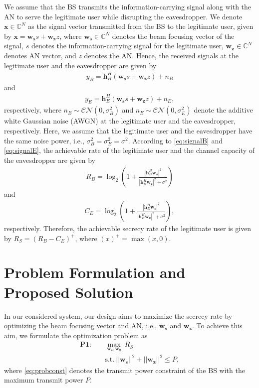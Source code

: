\documentclass[10pt,technote]{IEEEtran}
\newcommand{\1}{\mathbbm{1}}
\begin{document}
We assume that the BS transmits the information-carrying signal along with the AN to serve the legitimate user while disrupting the eavesdropper. We denote $\mathbf{x}\in \mathbb{C}^N$ as the signal vector transmitted from the BS to the legitimate user, given by $\mathbf{x} = \mathbf{w_s}s + \mathbf{w_z}z$, where $\mathbf{w_s}\in \mathbb{C}^N$ denotes the beam focusing vector of the signal, $s$ denotes the information-carrying signal for the legitimate user, $\mathbf{w_z}\in \mathbb{C}^N$ denotes AN vector, and $z$ denotes the AN. Hence, the received signals at the legitimate user and the eavesdropper are given by
\begin{align}\label{eq:signalB}
y_B =  \mathbf{h}_{B}^{H} \left(\mathbf{w_s}s + \mathbf{w_z}z\right)+n_{B}
\end{align}
and
\begin{align}\label{eq:signalE}
y_E =  \mathbf{h}_{E}^{H} \left(\mathbf{w_s}s + \mathbf{w_z}z\right)+n_{E},
\end{align}
respectively, where $n_B\sim \mathcal{CN}(0,\sigma_B^2)$ and $n_E\sim \mathcal{CN}(0,\sigma_E^2)$ denote the additive white Gaussian noise (AWGN) at the legitimate user and the eavesdropper, respectively. Here, we assume that the legitimate user and the eavesdropper have the same noise power, i.e., $\sigma_B^2=\sigma_E^2=\sigma^2$. According to \eqref{eq:signalB} and \eqref{eq:signalE}, the achievable rate of the legitimate user and the channel capacity of the eavesdropper are given by
\begin{align}
R_B = \log_2\left(1+\frac{|\mathbf{h}_{B}^{H} \mathbf{w_s}|^2}{|\mathbf{h}_{B}^{H}\mathbf{w_z}|^2+\sigma^2}\right)
\end{align}
and 
\begin{align}
C_E = \log_2\left(1+\frac{|\mathbf{h}_{E}^{H} \mathbf{w_s}|^2}{|\mathbf{h}_{E}^{H}\mathbf{w_z}|^2+\sigma^2}\right),
\end{align}
respectively. Therefore, the achievable secrecy rate of the legitimate user is given by $R_S = \left(R_B-C_E\right)^+$, where $(x)^+=\max(x,0)$. 

\section{Problem Formulation and Proposed Solution}\label{Sec:Coverage}

In our considered system, our design aims to maximize the secrecy rate by optimizing the beam focusing vector and AN, i.e., $ \mathbf{w_s}$ and $\mathbf{w_z}$. To achieve this aim, we formulate the optimization problem as
\begin{subequations}
\begin{align}
\mathbf{P1}:\quad &\max\limits_{\mathbf{w_s},\mathbf{w_z}}\  R_S\\
&\mathrm{s.t.}\  ||\mathbf{w_s}||^2+||\mathbf{w_z}||^2\leq P,\label{eq:probconst}
\end{align}
\end{subequations}
where \eqref{eq:probconst} denotes the transmit power constraint of the BS with the maximum transmit power $P$.
\end{document}
